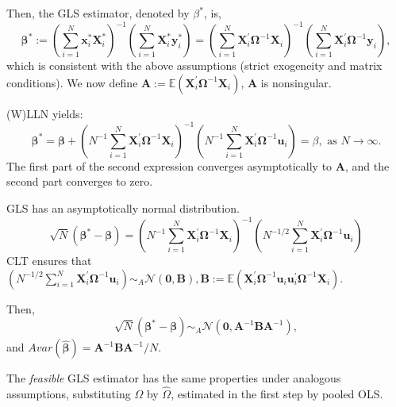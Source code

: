 \documentclass[11pt, a4paper]{report}
\theoremstyle{plain}
\theoremstyle{plain}
\theoremstyle{remark}
\begin{document}
Then, the GLS estimator, denoted by $\beta^*$, is,
\begin{equation}
    \boldsymbol{\beta}^{*} := \left(\sum_{i=1}^{N} \mathbf{x}_{i}^{*} \mathbf{X}_{i}^{*}\right)^{-1}\left(\sum_{i=1}^{N} \mathbf{X}_{i}^{*} \mathbf{y}_{i}^{*}\right)=\left(\sum_{i=1}^{N} \mathbf{X}_{i}^{\prime} \mathbf{\Omega}^{-1} \mathbf{X}_{i}\right)^{-1}\left(\sum_{i=1}^{N} \mathbf{X}_{i}^{\prime} \mathbf{\Omega}^{-1} \mathbf{y}_{i}\right),
    \end{equation}
which is consistent with the above assumptions (strict exogeneity and matrix conditions).
We now define $\mathbf{A} := \mathbb{E}\left(\mathbf{X}_{i}^{\prime} \mathbf{\Omega}^{-1} \mathbf{X}_{i}\right)$, $\mathbf{A}$ is nonsingular.

(W)LLN yields:
\begin{equation}
    \boldsymbol{\beta}^{*}=\boldsymbol{\beta}+\left(N^{-1} \sum_{i=1}^{N} \mathbf{X}_{i}^{\prime} \mathbf{\Omega}^{-1} \mathbf{X}_{i}\right)^{-1}\left(N^{-1} \sum_{i=1}^{N} \mathbf{X}_{i}^{\prime} \mathbf{\Omega}^{-1} \mathbf{u}_{i}\right) = \beta, \, \, \mathrm{as} \, \, N \to \infty.
\end{equation}
The first part of the second expression converges asymptotically to $\mathbf{A}$, and the second part converges to zero.

GLS has an asymptotically normal distribution. 
\begin{equation}
    \sqrt{N}\left(\boldsymbol{\beta}^{*}-\boldsymbol{\beta}\right)=\left(N^{-1} \sum_{i=1}^{N} \mathbf{X}_{i}^{\prime} \boldsymbol{\Omega}^{-1} \mathbf{X}_{i}\right)^{-1}\left(N^{-1 / 2} \sum_{i=1}^{N} \mathbf{X}_{i}^{\prime} \boldsymbol{\Omega}^{-1} \mathbf{u}_{i}\right)
\end{equation}
CLT ensures that $\left(N^{-1 / 2} \sum_{i=1}^{N} \mathbf{X}_{i}^{\prime} \boldsymbol{\Omega}^{-1} \mathbf{u}_{i}\right) \sim_A \mathcal{N}(\mathbf{0,B}), \mathbf{B} := \mathbb{E}\left(\mathbf{X}_{i}^{\prime} \mathbf{\Omega}^{-1} \mathbf{u}_{i} \mathbf{u}_{i}^{\prime} \mathbf{\Omega}^{-1} \mathbf{X}_{i}\right)$.

Then, 
\begin{equation}
\sqrt{N}\left(\boldsymbol{\beta}^{*}-\boldsymbol{\beta}\right) {\sim}_A \mathcal{N}\left(\mathbf{0}, \mathbf{A}^{-1} \mathbf{B} \mathbf{A}^{-1}\right),
\end{equation}
and $Avar(\hat{\boldsymbol{\beta}})=\mathbf{A}^{-1} \mathbf{B} \mathbf{A}^{-1} / N$.

The \textit{feasible} GLS estimator has the same properties under analogous assumptions, substituting $\Omega$ by $\widehat{\Omega}$, estimated in the first step by pooled OLS.
\end{document}
